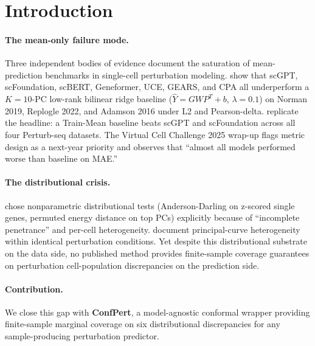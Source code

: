 \documentclass{article}
\begin{document}
\begin{abstract}
tested; ConfPert/uncalibrated ratio stays in $[1.20\times, 1.43\times]$). Our pip-installable \texttt{confpert} library + Cell-Eval plug-in registers six new metrics that fill the gap in Arc Institute's evaluation backbone (5 of 6 absent at commit \texttt{2db6b9c6}).
\end{abstract}

\section{Introduction}

\paragraph{The mean-only failure mode.}
Three independent bodies of evidence document the saturation of mean-prediction benchmarks in single-cell perturbation modeling. \citet{ahlmann2025} show that scGPT, scFoundation, scBERT, Geneformer, UCE, GEARS, and CPA all underperform a $K=10$-PC low-rank bilinear ridge baseline ($\hat{Y} = G W P^T + b$, $\lambda = 0.1$) on Norman 2019, Replogle 2022, and Adamson 2016 under L2 and Pearson-delta. \citet{csendes2025} replicate the headline: a Train-Mean baseline beats scGPT and scFoundation across all four Perturb-seq datasets. The Virtual Cell Challenge 2025 wrap-up flags metric design as a next-year priority and observes that ``almost all models performed worse than baseline on MAE.''

\paragraph{The distributional crisis.}
\citet{replogle2022} chose nonparametric distributional tests (Anderson-Darling on z-scored single genes, permuted energy distance on top PCs) explicitly because of ``incomplete penetrance'' and per-cell heterogeneity. \citet{norman2019} document principal-curve heterogeneity within identical perturbation conditions. Yet despite this distributional substrate on the data side, no published method provides finite-sample coverage guarantees on perturbation cell-population discrepancies on the prediction side.

\paragraph{Contribution.}
We close this gap with \textbf{ConfPert}, a model-agnostic conformal wrapper providing finite-sample marginal coverage on six distributional discrepancies for any sample-producing perturbation predictor.
\end{document}
